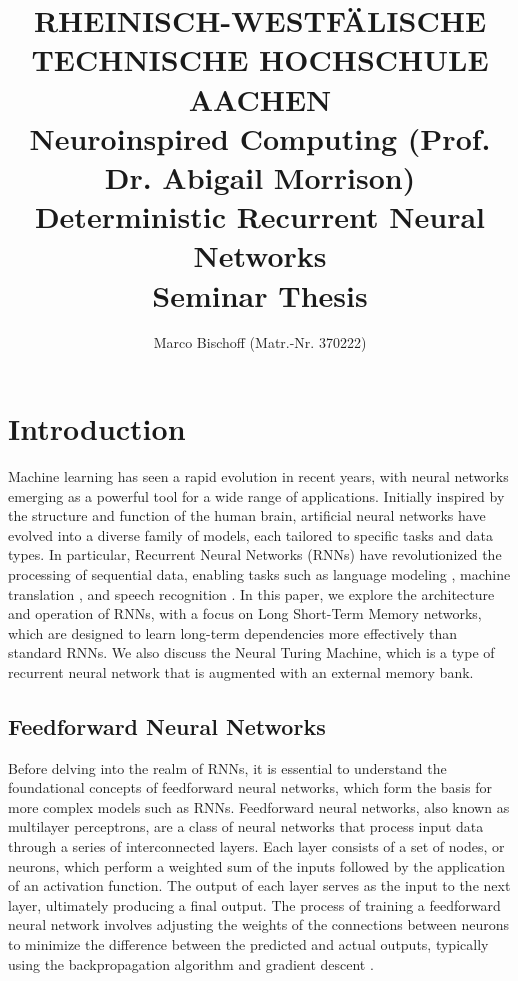 \documentclass{article}
\title{
  {\bf \scriptsize
    RHEINISCH-WESTF\"ALISCHE TECHNISCHE HOCHSCHULE AACHEN \\
    Neuroinspired Computing (Prof. Dr. Abigail Morrison)
  } \vspace{2cm} \\
  Deterministic Recurrent Neural Networks \\
  {\large Seminar Thesis} 
}
\author{Marco Bischoff (Matr.-Nr. 370222)}
\begin{document}
\pagestyle{headings}

\maketitle
\newpage

\tableofcontents
\newpage



\section{Introduction}
\label{ch:1}

Machine learning has seen a rapid evolution in recent years, with neural networks emerging
as a powerful tool for a wide range of applications. Initially inspired by the structure
and function of the human brain, artificial neural networks have evolved into a diverse
family of models, each tailored to specific tasks and data types. In particular, Recurrent
Neural Networks (RNNs) have revolutionized the processing of sequential data, enabling
tasks such as language modeling \cite{merity2017regularizing}, machine translation
\cite{choLearningPhraseRepresentations2014}, and speech recognition
\cite{graves2013speech}. In this paper, we explore the architecture and operation of RNNs,
with a focus on Long Short-Term Memory networks, which are designed to learn long-term
dependencies more effectively than standard RNNs. We also discuss the Neural Turing
Machine, which is a type of recurrent neural network that is augmented with an external
memory bank.


\subsection{Feedforward Neural Networks}
\label{sec:1.0}

Before delving into the realm of RNNs, it is essential to understand the foundational
concepts of feedforward neural networks, which form the basis for more complex models such
as RNNs. Feedforward neural networks, also known as multilayer perceptrons, are a class of
neural networks that process input data through a series of interconnected layers. Each
layer consists of a set of nodes, or neurons, which perform a weighted sum of the inputs
followed by the application of an activation function. The output of each layer serves as
the input to the next layer, ultimately producing a final output. The process of training
a feedforward neural network involves adjusting the weights of the connections between
neurons to minimize the difference between the predicted and actual outputs, typically
using the backpropagation algorithm and gradient descent \cite{mitchell_machine_1997}.
\end{document}
